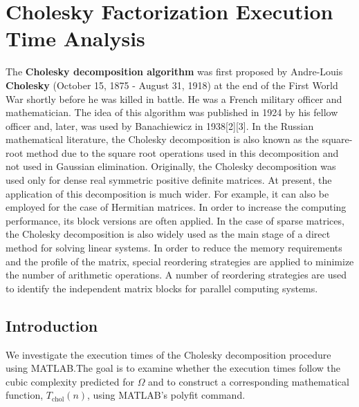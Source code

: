 \chapter{Cholesky Factorization Execution Time Analysis}
The \textbf{Cholesky decomposition algorithm} was first proposed by Andre-Louis \textbf{Cholesky} (October 15, 1875 - August 31, 1918) at the end of the First World War shortly before he was killed in battle. He was a French military officer and mathematician. The idea of this algorithm was published in 1924 by his fellow officer and, later, was used by Banachiewicz in 1938[2][3]. In the Russian mathematical literature, the Cholesky decomposition is also known as the square-root method due to the square root operations used in this decomposition and not used in Gaussian elimination.
\newline
Originally, the Cholesky decomposition was used only for dense real symmetric positive definite matrices. At present, the application of this decomposition is much wider. For example, it can also be employed for the case of Hermitian matrices. In order to increase the computing performance, its block versions are often applied.
\newline
In the case of sparse matrices, the Cholesky decomposition is also widely used as the main stage of a direct method for solving linear systems. In order to reduce the memory requirements and the profile of the matrix, special reordering strategies are applied to minimize the number of arithmetic operations. A number of reordering strategies are used to identify the independent matrix blocks for parallel computing systems.
\section*{Introduction}
We investigate the execution times of the Cholesky decomposition procedure using MATLAB.The goal is to examine whether the execution times follow the cubic complexity predicted for $\Omega$ and to construct a corresponding mathematical function, $T_{\text{chol}}(n)$, using MATLAB's polyfit command.\newline

